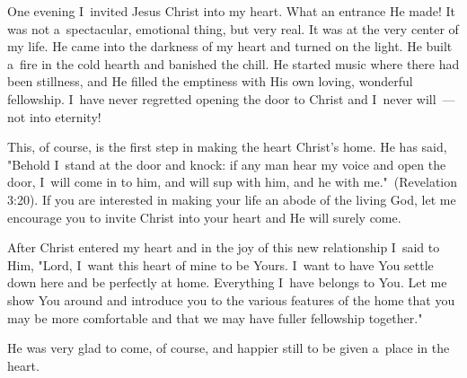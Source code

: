 \documentclass[a4paper,12pt]{article}
\begin{document}
\begin{multicols}{2}
One evening I~invited Jesus Christ into my heart. What an entrance He made! It was not a~spectacular, emotional thing, but very real. It was at the very center of my life. He came into the darkness of my heart and turned on the light. He built a~fire in the cold hearth and banished the chill. He started music where there had been stillness, and He filled the emptiness with His own loving, wonderful fellowship. I~have never regretted opening the door to Christ and I~never will~--- not into eternity! 

This, of course, is the first step in making the heart Christ's home. He has said, "Behold I~stand at the door and knock: if any man hear my voice and open the door, I~will come in to him, and will sup with him, and he with me."~(Revelation 3:20). If you are interested in making your life an abode of the living God, let me encourage you to invite Christ into your heart and He will surely come. 

After Christ entered my heart and in the joy of this new relationship I~said to Him, "Lord, I~want this heart of mine to be Yours. I~want to have You settle down here and be perfectly at home. Everything I~have belongs to You. Let me show You around and introduce you to the various features of the home that you may be more comfortable and that we may have fuller fellowship 
together." 

He was very glad to come, of course, and happier still to be given a~place in the heart.
\end{multicols}
\end{document}

